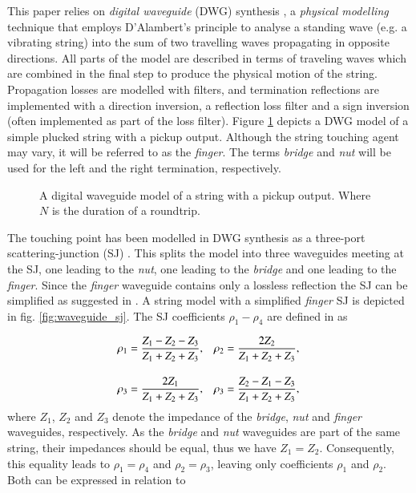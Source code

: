 \documentclass{sigchi}
\begin{document}
This paper relies on \textit{digital waveguide} (DWG) synthesis \cite{smith_physical_1992}, a \textit{physical modelling} technique that employs D'Alambert's principle to analyse a standing wave (e.g. a vibrating string) into the sum of two travelling waves propagating in opposite directions.
All parts of the model are described in terms of traveling waves which are combined in the final step to produce the physical motion of the string.
Propagation losses are modelled with filters, and termination reflections are implemented with a direction inversion, a reflection loss filter and a sign inversion (often implemented as part of the loss filter).
Figure \ref{fig:pickup} depicts a DWG model of a simple plucked string with a pickup output.
Although the string touching agent may vary, it will be referred to as the \textit{finger}.
The terms \textit{bridge} and \textit{nut} will be used for the left and the right termination, respectively.

\begin{figure}[h]
	\centering
	\scalebox{0.75}{}
	\caption{
		A digital waveguide model of a string with a pickup output.
		Where $N$ is the duration of a roundtrip.
	}
	\label{fig:pickup}
\end{figure}

The touching point has been modelled in DWG synthesis as a three-port scattering-junction (SJ) \cite{scavone_digital_1997, valimaki_modeling_1993}.
This splits the model into three waveguides meeting at the SJ, one leading to the \textit{nut}, one leading to the \textit{bridge} and one leading to the \textit{finger}.
Since the \textit{finger} waveguide contains only a lossless reflection the SJ can be simplified as suggested in \cite{pakarinen_physical_2005}.
A string model with a simplified \textit{finger} SJ is depicted in fig. \ref{fig:waveguide_sj}.
The SJ coefficients $\rho_1 - \rho_4$ are defined in \cite{pakarinen_physical_2005} as

\begin{align} \label{eq:rhoCoeff}
	\rho_1 & = \frac{Z_1-Z_2-Z_3}{Z_1+Z_2+Z_3}, &
	\rho_2 & = \frac{2Z_2}{Z_1+Z_2+Z_3},\notag    \\[1em]
	\rho_3 & = \frac{2Z_1}{Z_1+Z_2+Z_3},        &
	\rho_3 & = \frac{Z_2-Z_1-Z_3}{Z_1+Z_2+Z_3},
\end{align}
where $Z_1$, $Z_2$ and $Z_3$ denote the impedance of the \textit{bridge}, \textit{nut} and \textit{finger} waveguides, respectively.
As the \textit{bridge} and \textit{nut} waveguides are part of the same string, their impedances should be equal, thus we have $Z_1=Z_2$.
Consequently, this equality leads to $\rho_1=\rho_4$ and $\rho_2=\rho_3$, leaving only coefficients $\rho_1$ and $\rho_2$.
Both can be expressed in relation to
\end{document}
